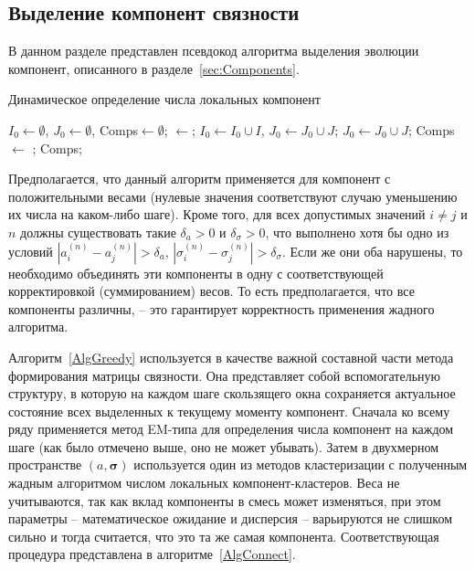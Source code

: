 \subsection{Выделение компонент связности}
\label{sec:ComponentsAlgo}
В данном разделе представлен псевдокод алгоритма выделения эволюции компонент, описанного в разделе~\ref{sec:Components}.
\begin{algorithm}[!h]
	\caption{Динамическое определение числа локальных компонент}
	\label{AlgGreedy}
	\begin{algorithmic}[1]
		\State  $I_0\gets \emptyset$, $J_0\gets \emptyset$, Comps$\gets \emptyset$;
		\Repeat {}
		\State {}
		\State [I, J]$\gets$;
		\State $I_0\gets I_0\cup I$, $J_0\gets J_0\cup J$;
		\Else{}
		\State $J_0\gets J_0\cup J$;
		\State Comps $\gets$ ;
		\EndIf
		\State \Return Comps;
		\EndFunction
	\end{algorithmic}
\end{algorithm}

Предполагается, что данный алгоритм применяется для компонент с положительными весами (нулевые значения соответствуют случаю уменьшению их числа на каком-либо шаге). Кроме того, для всех допустимых значений $i\neq j$ и $n$ должны существовать такие $\delta_a>0$ и $\delta_\sigma>0$, что выполнено хотя бы одно из условий $\left|a_i^{(n)}-a_j^{(n)}\right|>\delta_a$, $\left|\sigma_i^{(n)}-\sigma_j^{(n)}\right|>\delta_\sigma$. Если же они оба нарушены, то необходимо объединять эти компоненты в одну с соответствующей корректировкой (суммированием) весов. То есть предполагается, что все компоненты различны, -- это гарантирует корректность применения жадного алгоритма.

Алгоритм~\ref{AlgGreedy} используется в качестве важной составной части  метода формирования матрицы связности. Она представляет собой вспомогательную структуру, в которую на каждом шаге скользящего окна сохраняется актуальное состояние всех выделенных к текущему моменту компонент. Сначала ко всему ряду применяется метод EM-типа для определения числа компонент на каждом шаге (как было отмечено выше, оно не может убывать). Затем в двухмерном пространстве $(a, \boldsymbol \sigma)$ используется один из методов кластеризации с полученным жадным алгоритмом числом локальных компонент-кластеров. Веса не учитываются, так как вклад компоненты в смесь может изменяться, при этом параметры -- математическое ожидание и дисперсия -- варьируются не слишком сильно и тогда считается, что это та же самая компонента. Соответствующая процедура представлена в алгоритме~\ref{AlgConnect}.

